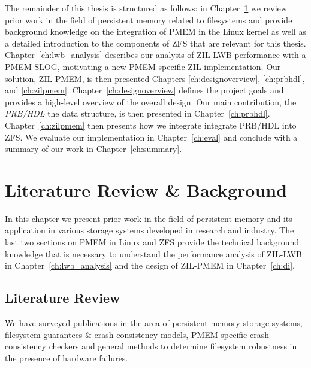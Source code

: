 \documentclass[12pt,a4paper,twoside]{book}
\begin{document}
The remainder of this thesis is structured as follows:
in Chapter~\ref{ch:litreviewandbackground} we
 review prior work in the field of persistent memory related to filesystems and
 provide background knowledge on the integration of PMEM in the Linux kernel as well as
 a detailed introduction to the components of ZFS that are relevant for this thesis.
Chapter~\ref{ch:lwb_analysis} describes our analysis of ZIL-LWB performance with a PMEM SLOG, motivating a new PMEM-specific ZIL implementation.
Our solution, ZIL-PMEM, is then presented Chapters \ref{ch:designoverview}, \ref{ch:prbhdl}, and \ref{ch:zilpmem}.
Chapter~\ref{ch:designoverview} defines the project goals and provides a high-level overview of the overall design.
Our main contribution, the \textit{PRB/HDL} the data structure, is then presented in Chapter~\ref{ch:prbhdl}.
Chapter~\ref{ch:zilpmem} then presents how we integrate integrate PRB/HDL into ZFS.
We evaluate our implementation in Chapter~\ref{ch:eval} and conclude with a summary of our work in Chapter~\ref{ch:summary}.


\chapter{Literature Review \& Background}\label{ch:litreviewandbackground}
In this chapter we present prior work in the field of persistent memory and its application in various storage systems developed in research and industry.
The last two sections on PMEM in Linux and ZFS provide the technical background knowledge that is necessary to understand the performance analysis of ZIL-LWB in Chapter~\ref{ch:lwb_analysis} and the design of ZIL-PMEM in Chapter~\ref{ch:di}.

\section{Literature Review}
We have surveyed publications in the area of persistent memory storage systems, filesystem guarantees \& crash-consistency models, PMEM-specific crash-consistency checkers and general methods to determine filesystem robustness in the presence of hardware failures.
\end{document}
